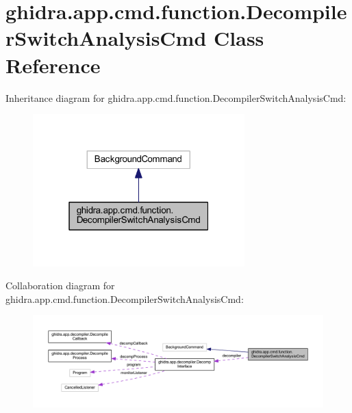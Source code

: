 \hypertarget{classghidra_1_1app_1_1cmd_1_1function_1_1_decompiler_switch_analysis_cmd}{}\section{ghidra.\+app.\+cmd.\+function.\+Decompiler\+Switch\+Analysis\+Cmd Class Reference}
\label{classghidra_1_1app_1_1cmd_1_1function_1_1_decompiler_switch_analysis_cmd}


Inheritance diagram for ghidra.\+app.\+cmd.\+function.\+Decompiler\+Switch\+Analysis\+Cmd\+:
\nopagebreak
\begin{figure}[H]
\begin{center}
\leavevmode
\includegraphics[width=232pt]{classghidra_1_1app_1_1cmd_1_1function_1_1_decompiler_switch_analysis_cmd__inherit__graph}
\end{center}
\end{figure}


Collaboration diagram for ghidra.\+app.\+cmd.\+function.\+Decompiler\+Switch\+Analysis\+Cmd\+:
\nopagebreak
\begin{figure}[H]
\begin{center}
\leavevmode
\includegraphics[width=350pt]{classghidra_1_1app_1_1cmd_1_1function_1_1_decompiler_switch_analysis_cmd__coll__graph}
\end{center}
\end{figure}
